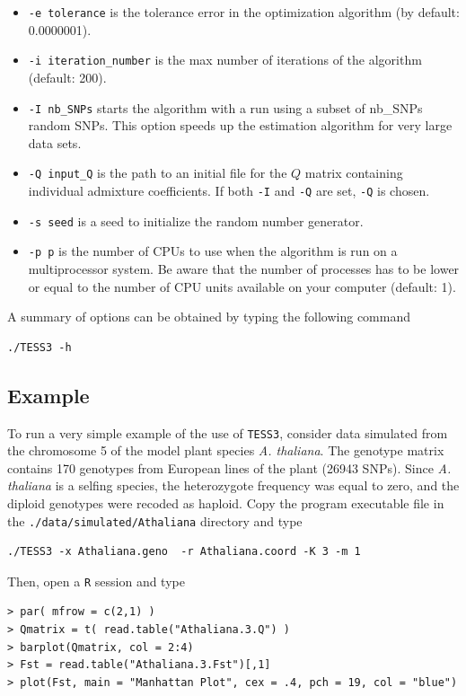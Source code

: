 \documentclass[10pt,a4paper]{article}
\begin{document}
\begin{itemize}
\item \verb|-e tolerance| is the tolerance error in the optimization algorithm (by default: 0.0000001). 
\item \verb|-i iteration_number| is the max number of iterations of the algorithm (default: 200). 
\item \verb|-I nb_SNPs| starts the algorithm with a run using a subset of nb\_SNPs random SNPs. This option speeds up the estimation algorithm for very large data sets.
\item \verb|-Q input_Q| is the path to an initial file for the $Q$ matrix containing individual admixture coefficients. If both \verb|-I| and \verb|-Q| are set, \verb|-Q| is chosen.
\item \verb|-s seed| is a seed to initialize the random number generator. 
\item \verb|-p p| is the number of CPUs to use when the algorithm is run on a multiprocessor system.
Be aware that the number of processes has to be lower or equal to the number of CPU units available on your computer (default: 1).

\end{itemize}


\noindent A summary of options can be obtained  by typing the following command
\footnotesize
\begin{Verbatim}[frame=single]
./TESS3 -h
\end{Verbatim}
\noindent
\normalsize


\subsection{Example}

To run a very simple example of the use of {\tt TESS3}, consider data simulated from the chromosome 5 of the model plant species {\it A. thaliana}. The genotype matrix contains 170 genotypes from European lines of the plant (26943 SNPs). Since {\it A. thaliana} is a selfing species, the heterozygote frequency was equal to zero, and the diploid genotypes were recoded as haploid. Copy the program executable file in the {\tt ./data/simulated/Athaliana} directory and type

\begin{Verbatim}[frame=single]
./TESS3 -x Athaliana.geno  -r Athaliana.coord -K 3 -m 1
\end{Verbatim}

\noindent Then, open a {\tt R} session and type


\begin{Verbatim}[frame=single]
> par( mfrow = c(2,1) )
> Qmatrix = t( read.table("Athaliana.3.Q") )
> barplot(Qmatrix, col = 2:4)
> Fst = read.table("Athaliana.3.Fst")[,1]
> plot(Fst, main = "Manhattan Plot", cex = .4, pch = 19, col = "blue")
\end{Verbatim}
\end{document}
